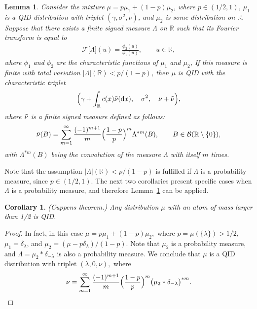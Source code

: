 \documentclass[10pt,a4paper]{amsart}
\newtheorem{lem}{Lemma}
\newtheorem{cor}{Corollary}
\newcommand{\B}{\mathcal{B}}%
\newcommand{\F}{\mathcal{F}}
\newcommand{\R}{{\mathbb{R}}}
\begin{document}
\begin{lem} \label{magic_lem1}
Consider the mixture $\mu = p\mu_1 + (1-p)\mu_2$, where  $p \in (1/2, 1)$,  $\mu_1$ is a QID distribution with  triplet $(\gamma, \sigma^2, \nu)$, and $\mu_2$ is some distribution on \(\R.\) Suppose  that there exists a finite signed measure $\Lambda$ on $\mathbb{R}$ such that its Fourier transform is equal to 
\begin{eqnarray}\label{mu12}
\F\bigl[\Lambda \bigr](u) = \frac{\phi_2(u)}{\phi_1(u)}, \qquad u \in \R,
\end{eqnarray}
where   $\phi_1$ and $\phi_2$ are the characteristic functions of $\mu_1$ and $\mu_2$, If this measure is finite with total variation $|\Lambda|(\mathbb{R}) < p/(1-p)$, then $\mu$ is QID with the characteristic triplet \[\Bigl(\gamma + \int_{\mathbb{R}}c(x)\Tilde{\nu}(\mathrm{d}x),  \quad \sigma^2, \quad  \nu + \Tilde{\nu}\Bigr),\]
where $\Tilde{\nu}$ is a finite signed measure defined as follows: 
\begin{equation}\label{Tildenu}
    \Tilde{\nu}(B) = \sum_{m = 1}^{\infty} \frac{(-1)^{m + 1}}{m}\Bigl( 
\frac{1-p}{p} 
\Bigr)^m\Lambda^{*m}(B), \qquad B \in \B(\R\setminus\{0\}),
\end{equation}
with $\Lambda^{*m}(B)$ being the convolution of the measure $\Lambda$ with itself  $m$ times.\end{lem}

Note that the assumption $|\Lambda|(\mathbb{R}) < p/(1-p)$ is fulfilled if \(\Lambda\) is a probability measure, since \(p \in (1/2,1)\). The next two corollaries present specific cases when \(\Lambda\) is a probability measure, and therefore Lemma~\ref{magic_lem1} can be applied.\begin{cor}
(Cuppens theorem.) Any distribution \(\mu\) with an atom of mass larger than 1/2 is QID. 
\end{cor}

\begin{proof}
In fact, in this case \(\mu = p \mu_1 + (1-p) \mu_2,\) where \(p=\mu(\{\lambda\})>1/2\), \(\mu_1 = \delta_\lambda\), and 
\(\mu_2 = (\mu - p \delta_\lambda)/(1-p).\) Note that \(\mu_2\) is a probability measure, and \(\Lambda=\mu_2 * \delta_{-\lambda}\)   is also a probability measure. We conclude that   \(\mu\)  is a QID distribution with triplet \((\lambda,0, \nu),\)  where 
\begin{eqnarray*}
\nu = \sum_{m=1}^\infty \frac{(-1)^{m+1}}{m}
\Bigl( 
\frac{1-p}{p} 
\Bigr)^m \bigl(  \mu_2 * \delta_{-\lambda} \bigr)^{*m}.
\end{eqnarray*}
\end{proof}
\end{document}
